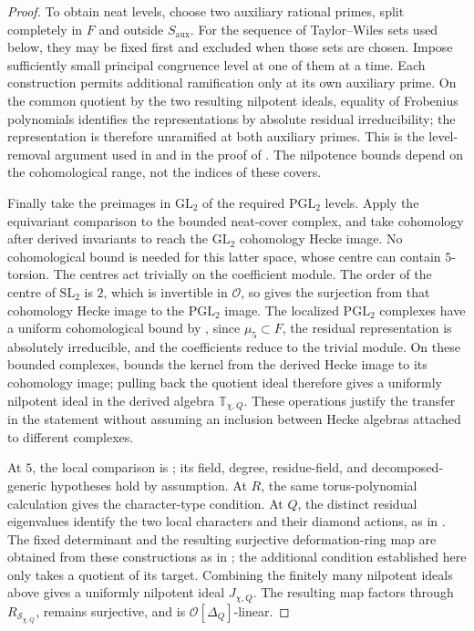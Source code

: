 \documentclass[11pt,a4paper]{article}
\numberwithin{equation}{section}
\begin{document}
\begin{proof}
To obtain neat levels, choose two auxiliary rational primes, split completely in \(F\) and outside \(S_{\mathrm{aux}}\). For the sequence of Taylor--Wiles sets used below, they may be fixed first and excluded when those sets are chosen. Impose sufficiently small principal congruence level at one of them at a time. Each construction permits additional ramification only at its own auxiliary prime. On the common quotient by the two resulting nilpotent ideals, equality of Frobenius polynomials identifies the representations by absolute residual irreducibility; the representation is therefore unramified at both auxiliary primes. This is the level-removal argument used in \cite[\S3.2]{ACC} and in the proof of \cite[Theorem~5.8]{AKT}. The nilpotence bounds depend on the cohomological range, not the indices of these covers.

Finally take the preimages in \(\mathrm{GL}_2\) of the required \(\mathrm{PGL}_2\) levels. Apply the equivariant comparison to the bounded neat-cover complex, and take cohomology after derived invariants to reach the \(\mathrm{GL}_2\) cohomology Hecke image. No cohomological bound is needed for this latter space, whose centre can contain \(5\)-torsion. The centres act trivially on the coefficient module. The order of the centre of \(\mathrm{SL}_2\) is \(2\), which is invertible in \(\mathcal O\), so \cite[Corollary~5.5]{AKT} gives the surjection from that cohomology Hecke image to the \(\mathrm{PGL}_2\) image. The localized \(\mathrm{PGL}_2\) complexes have a uniform cohomological bound by \cite[Theorem~5.11]{AKT}, since \(\mu_5\subset F\), the residual representation is absolutely irreducible, and the coefficients reduce to the trivial module. On these bounded complexes, \cite[Lemma~2.2.3]{ACC} bounds the kernel from the derived Hecke image to its cohomology image; pulling back the quotient ideal therefore gives a uniformly nilpotent ideal in the derived algebra \(\mathbb T_{\chi,Q}\). These operations justify the transfer in the statement without assuming an inclusion between Hecke algebras attached to different complexes.

At \(5\), the local comparison is \cite[Theorem~4.2.15]{CN}; its field, degree, residue-field, and decomposed-generic hypotheses hold by assumption. At \(R\), the same torus-polynomial calculation gives the character-type condition. At \(Q\), the distinct residual eigenvalues identify the two local characters and their diamond actions, as in \cite[Proposition~6.5.11]{ACC}. The fixed determinant and the resulting surjective deformation-ring map are obtained from these constructions as in \cite[Propositions~5.5.2 and 5.6.2--5.6.3]{CN}; the additional condition established here only takes a quotient of its target. Combining the finitely many nilpotent ideals above gives a uniformly nilpotent ideal \(J_{\chi,Q}\). The resulting map factors through \(R_{\mathcal S_{\chi,Q}}\), remains surjective, and is \(\mathcal O[\Delta_Q]\)-linear.


\end{proof}
\end{document}
